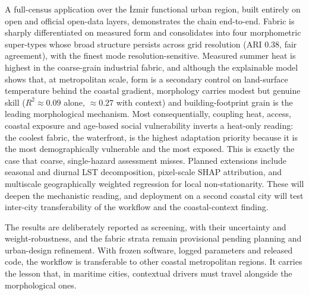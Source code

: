 A full-census application over the \.{I}zmir functional urban region, built entirely on open and official
open-data layers, demonstrates the chain end-to-end. Fabric is sharply
differentiated on measured form and consolidates into four morphometric
super-types whose broad structure persists across grid resolution (ARI 0.38, fair
agreement), with the finest mode resolution-sensitive.
Measured summer heat is highest in the coarse-grain industrial fabric, and although
the explainable model shows that, at metropolitan scale, form is a secondary
control on land-surface temperature behind the coastal gradient, morphology carries
modest but genuine skill ($R^2\approx0.09$ alone, $\approx0.27$ with context) and
building-footprint grain is the leading morphological mechanism. Most consequentially, coupling heat,
access, coastal exposure and age-based social vulnerability inverts a heat-only
reading: the coolest fabric, the waterfront, is the highest adaptation priority
because it is the most demographically vulnerable and the most exposed. This is exactly the
case that coarse, single-hazard assessment misses.
Planned extensions include seasonal and diurnal LST decomposition, pixel-scale SHAP
attribution, and multiscale geographically weighted regression for local
non-stationarity. These will deepen the mechanistic reading, and deployment on a second
coastal city will test inter-city transferability of the workflow and the
coastal-context finding.

The results are deliberately reported as screening, with their uncertainty and
weight-robustness, and the fabric strata remain provisional pending planning and
urban-design refinement. With frozen software, logged parameters and released code,
the workflow is transferable to other coastal metropolitan regions. It carries the
lesson that, in maritime cities, contextual drivers must travel alongside the
morphological ones.
